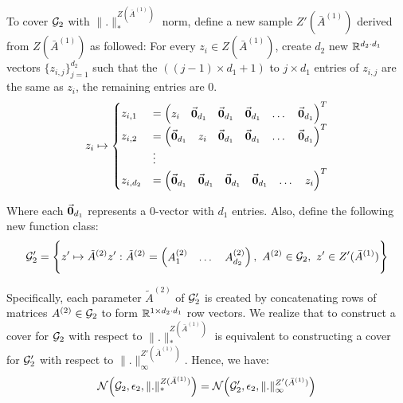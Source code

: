 \noindent To cover $\mathcal{G}_2$ with $\|.\|_*^{Z(\bar A^{(1)})}$ norm, define a new sample $Z'(\bar A^{(1)})$ derived from $Z(\bar A^{(1)})$ as followed: For every $z_i\in Z(\bar A^{(1)})$, create $d_2$ new $\mathbb{R}^{d_2 \cdot d_1}$ vectors $\{z_{i, j}\}_{j=1}^{d_2}$ such that the $((j-1)\times d_1 + 1)$ to $j \times d_1$ entries of $z_{i,j}$ are the same as $z_i$, the remaining entries are $0$. 
\begin{align*}
    z_i \mapsto \begin{cases}
        z_{i, 1} &= \begin{pmatrix}
            z_i & \vec{\bf 0}_{d_1} & \vec{\bf 0}_{d_1} & \vec{\bf 0}_{d_1} & \dots & \vec{\bf 0}_{d_1}
        \end{pmatrix}^T \\
        z_{i, 2} &= \begin{pmatrix}
            \vec{\bf 0}_{d_1} & z_i & \vec{\bf 0}_{d_1} & \vec{\bf 0}_{d_1} & \dots & \vec{\bf 0}_{d_1}
        \end{pmatrix}^T \\
        &\vdots \\
        z_{i, d_2} &= \begin{pmatrix}
            \vec{\bf 0}_{d_1} & \vec{\bf 0}_{d_1} & \vec{\bf 0}_{d_1} & \vec{\bf 0}_{d_1} & \dots & z_i
        \end{pmatrix}^T \\
    \end{cases}    
\end{align*}

\noindent Where each $\vec{\bf 0}_{d_1}$ represents a $0$-vector with $d_1$ entries. Also, define the following new function class:
\begin{align*}
    \mathcal{G}_2' = \Bigg\{ 
        z' \mapsto \tilde A^{(2)}z' : \tilde A^{(2)} = \begin{pmatrix}
            A^{(2)}_1 & \dots & A^{(2)}_{d_2}
        \end{pmatrix},  \ A^{(2)} \in \mathcal{G}_2, \ z' \in Z'(\bar A^{(1)})
     \Bigg\}
\end{align*}

\noindent Specifically, each parameter $\tilde A^{(2)}$ of $\mathcal{G}_2'$ is created by concatenating rows of matrices $A^{(2)}\in \mathcal{G}_2$ to form $\mathbb{R}^{1\times d_2\cdot d_1}$ row vectors. We realize that to construct a cover for $\mathcal{G}_2$ with respect to $\|.\|_*^{Z(\bar A^{(1)})}$ is equivalent to constructing a cover for $\mathcal{G}_2'$ with respect to $\|.\|_\infty^{Z'(\bar A^{(1)})}$. Hence, we have:
\begin{align*}
    \mathcal{N}\Big( \mathcal{G}_2, \epsilon_2, \|.\|_*^{Z(\bar A^{(1)})} \Big) = \mathcal{N}\Big( \mathcal{G}_2', \epsilon_2, \|.\|_\infty^{Z'(\bar A^{(1)})} \Big)
\end{align*}


